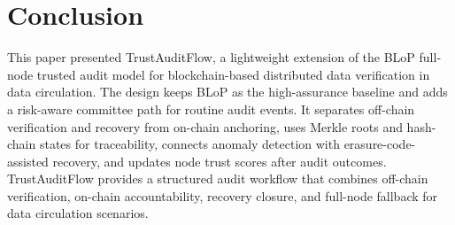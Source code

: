\section{Conclusion}

This paper presented TrustAuditFlow, a lightweight extension of the BLoP full-node trusted audit model for blockchain-based distributed data verification in data circulation. The design keeps BLoP as the high-assurance baseline and adds a risk-aware committee path for routine audit events. It separates off-chain verification and recovery from on-chain anchoring, uses Merkle roots and hash-chain states for traceability, connects anomaly detection with erasure-code-assisted recovery, and updates node trust scores after audit outcomes. TrustAuditFlow provides a structured audit workflow that combines off-chain verification, on-chain accountability, recovery closure, and full-node fallback for data circulation scenarios.
